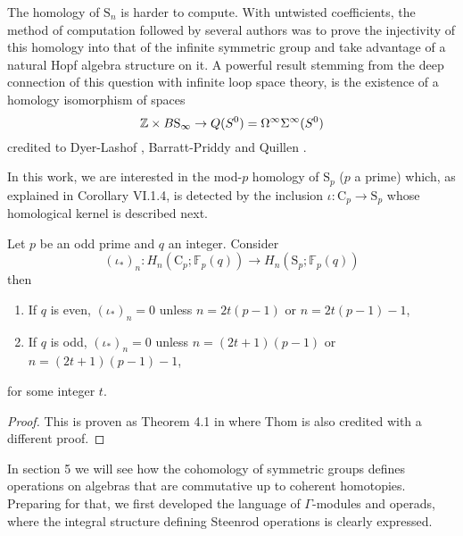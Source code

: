 The homology of $\mathrm{S}_n$ is harder to compute. With untwisted coefficients, the method of computation followed by several authors was to prove the injectivity of this homology into that of the infinite symmetric group and take advantage of a natural Hopf algebra structure on it. A powerful result stemming from the deep connection of this question with infinite loop space theory, is the existence of a homology isomorphism of spaces
\begin{equation*}
\mathbb{Z} \times B\mathrm{S}_\infty \to Q(S^0) = \Omega^\infty \Sigma^\infty (S^0)
\end{equation*}
credited to Dyer-Lashof \cite{dyer62lashof}, Barratt-Priddy and Quillen \cite{barratt1972priddy}.

In this work, we are interested in the mod-$p$ homology of $\mathrm{S}_p$ ($p$ a prime) which, as explained in \cite{adem2004milgram} Corollary VI.1.4, is detected by the inclusion $\iota : \mathrm{C}_p \to \mathrm{S}_p$ whose homological kernel is described next.

\begin{lemma} \label{lem: Thom's theorem}
	Let $p$ be an odd prime and $q$ an integer. Consider
	\begin{equation*}
	(\iota_\ast)_n : H_n(\mathrm{C}_p; \mathbb{F}_p(q)) \to H_n(\mathrm{S}_p; \mathbb{F}_p(q))
	\end{equation*}
	then
	\begin{enumerate}
		\item If $q$ is even, $(\iota_\ast)_n = 0$ unless $n = 2t(p-1)$ or $n = 2t(p-1) - 1$,
		\item If $q$ is odd, $(\iota_\ast)_n = 0$ unless $n = (2t+1)(p-1)$ or $n = (2t+1)(p-1)-1$,
	\end{enumerate}
	for some integer $t$.
\end{lemma}

\begin{proof}
	This is proven as Theorem 4.1 in \cite{steenrod53cyclic} where Thom is also credited with a different proof.
\end{proof}

In section 5 we will see how the cohomology of symmetric groups defines operations on algebras that are commutative up to coherent homotopies. Preparing for that, we first developed the language of $\Gamma$-modules and operads, where the integral structure defining Steenrod operations is clearly expressed.